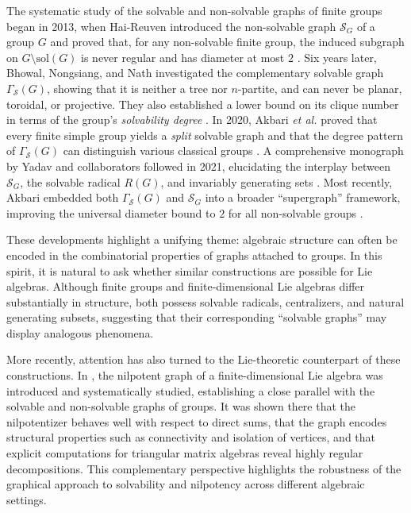 \documentclass[11pt]{amsart}
\theoremstyle{plain}
\def\sol{\mathrm{sol}}
\begin{document}
The systematic study of the solvable and non-solvable graphs of finite groups began in 2013, when Hai-Reuven introduced the non-solvable graph $\mathcal{S}_G$ of a group $G$ and proved that, for any non-solvable finite group, the induced subgraph on $G\setminus\sol(G)$ is never regular and has diameter at most $2$ \cite{HaiReuven}. Six years later, Bhowal, Nongsiang, and Nath investigated the complementary solvable graph $\Gamma_\mathcal{S}(G)$, showing that it is neither a tree nor $n$-partite, and can never be planar, toroidal, or projective. They also established a lower bound on its clique number in terms of the group’s \emph{solvability degree} \cite{Bhowal2019}. In 2020, Akbari \textit{et al.} proved that every finite simple group yields a \emph{split} solvable graph and that the degree pattern of $\Gamma_\mathcal{S}(G)$ can distinguish various classical groups \cite{Akbari2020}. A comprehensive monograph by Yadav and collaborators followed in 2021, elucidating the interplay between $\mathcal{S}_G$, the solvable radical $R(G)$, and invariably generating sets \cite{Yadav2021}. Most recently, Akbari embedded both $\Gamma_\mathcal{S}(G)$ and $\mathcal{S}_G$ into a broader ``supergraph'' framework, improving the universal diameter bound to $2$ for all non-solvable groups \cite{Akbari2024}.

These developments highlight a unifying theme: algebraic structure can often be encoded in the combinatorial properties of graphs attached to groups. In this spirit, it is natural to ask whether similar constructions are possible for Lie algebras. Although finite groups and finite-dimensional Lie algebras differ substantially in structure, both possess solvable radicals, centralizers, and natural generating subsets, suggesting that their corresponding ``solvable graphs'' may display analogous phenomena. 

More recently, attention has also turned to the Lie-theoretic counterpart of these constructions. In \cite{TGF}, the nilpotent graph of a finite-dimensional Lie algebra was introduced and systematically studied, establishing a close parallel with the solvable and non-solvable graphs of groups. It was shown there that the nilpotentizer behaves well with respect to direct sums, that the graph encodes structural properties such as connectivity and isolation of vertices, and that explicit computations for triangular matrix algebras reveal highly regular decompositions. This complementary perspective highlights the robustness of the graphical approach to solvability and nilpotency across different algebraic settings.
\end{document}
